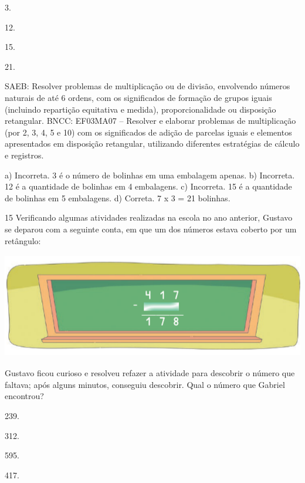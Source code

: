 \begin{multicols}{2}
\begin{enumerate}
{\begin{escolha}

\item
  3.
\item
  12.
\item
  15.
\item
  21.
\end{escolha}

SAEB: Resolver problemas de multiplicação ou de divisão, envolvendo números naturais de até 6 ordens, com os significados de formação de grupos iguais (incluindo repartição equitativa e medida), proporcionalidade ou disposição retangular.
BNCC: EF03MA07 – Resolver e elaborar problemas de multiplicação (por 2, 3, 4, 5 e 10) com os
significados de adição de parcelas iguais e elementos apresentados em disposição retangular,
utilizando diferentes estratégias de cálculo e registros.

a) Incorreta. 3 é o número de bolinhas em uma embalagem apenas.
b) Incorreta. 12 é a quantidade de bolinhas em 4 embalagens.
c) Incorreta. 15 é a quantidade de bolinhas em 5 embalagens.
d) Correta. 7 x 3 = 21 bolinhas.

\num{15} Verificando algumas atividades realizadas na escola no ano anterior, Gustavo se deparou com a seguinte conta, em que um dos números estava
coberto por um retângulo:


\includegraphics[width=5.39213in,height=1.80849in]{media/image141.png}


Gustavo ficou curioso e resolveu refazer a atividade para descobrir o número que faltava; após alguns minutos, conseguiu descobrir. Qual o número que Gabriel encontrou?

\begin{escolha}

\item
  239.
\item
  312.
\item
  595.
\item
  417.
\end{escolha}

}
\end{enumerate}
\end{multicols}
